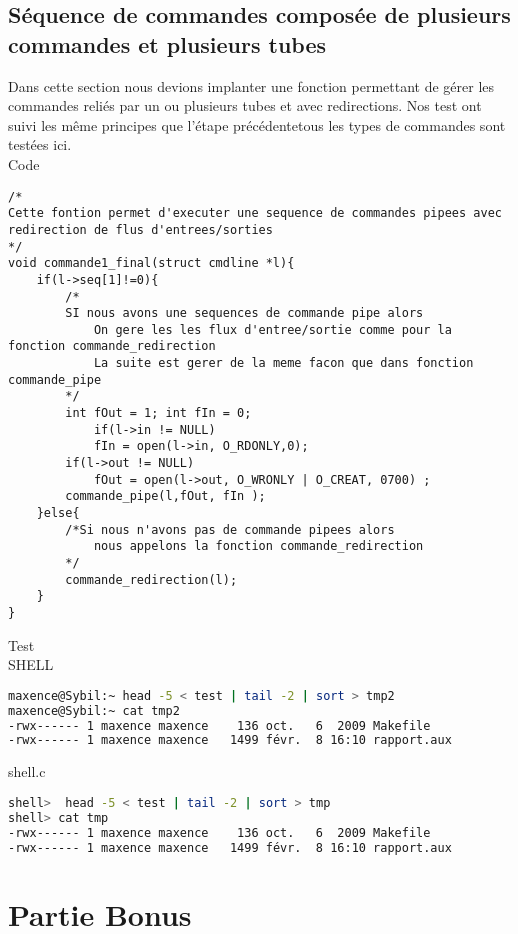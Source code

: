 \documentclass{report}
\begin{document}
		\section{S\'equence de commandes compos\'ee de plusieurs commandes et plusieurs tubes}
		Dans cette section nous devions implanter une fonction permettant de g\'erer les commandes reli\'es par un ou plusieurs tubes et avec redirections. Nos test ont suivi les m\^eme principes que l'\'etape pr\'ec\'edentetous les types de commandes sont test\'ees ici. \\ Code
			\begin{lstlisting}
/*
Cette fontion permet d'executer une sequence de commandes pipees avec redirection de flus d'entrees/sorties 
*/
void commande1_final(struct cmdline *l){
	if(l->seq[1]!=0){
		/*
		SI nous avons une sequences de commande pipe alors
			On gere les les flux d'entree/sortie comme pour la fonction commande_redirection
			La suite est gerer de la meme facon que dans fonction commande_pipe
		*/
		int fOut = 1; int fIn = 0;
			if(l->in != NULL)
			fIn = open(l->in, O_RDONLY,0);
		if(l->out != NULL)
			fOut = open(l->out, O_WRONLY | O_CREAT, 0700) ;
		commande_pipe(l,fOut, fIn );
	}else{
		/*Si nous n'avons pas de commande pipees alors
			nous appelons la fonction commande_redirection
		*/ 
		commande_redirection(l);
	}
}

			\end{lstlisting}
			Test \\ SHELL
			\begin{lstlisting}[frame=single,basicstyle=\footnotesize,language=bash]
maxence@Sybil:~ head -5 < test | tail -2 | sort > tmp2
maxence@Sybil:~ cat tmp2
-rwx------ 1 maxence maxence    136 oct.   6  2009 Makefile
-rwx------ 1 maxence maxence   1499 févr.  8 16:10 rapport.aux
			\end{lstlisting}
			shell.c
			\begin{lstlisting}[frame=single,basicstyle=\footnotesize,language=bash]
shell>  head -5 < test | tail -2 | sort > tmp
shell> cat tmp
-rwx------ 1 maxence maxence    136 oct.   6  2009 Makefile
-rwx------ 1 maxence maxence   1499 févr.  8 16:10 rapport.aux
			\end{lstlisting}
	\chapter{Partie Bonus}
\end{document}
